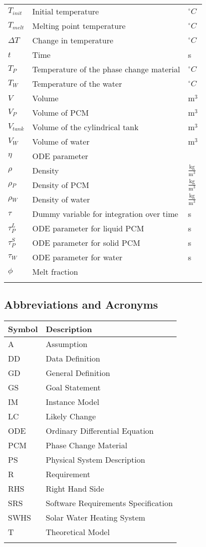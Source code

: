 \documentclass[12pt]{article}
\begin{document}
\begin{longtable*}{l l l}
$T_{init}$ & Initial temperature & ${}^{\circ}C$
\\
$T_{melt}$ & Melting point temperature & ${}^{\circ}C$
\\
$\Delta{}T$ & Change in temperature & ${}^{\circ}C$
\\
$t$ & Time & s
\\
$T_{P}$ & Temperature of the phase change material & ${}^{\circ}C$
\\
$T_{W}$ & Temperature of the water & ${}^{\circ}C$
\\
$V$ & Volume & $\text{m}^{3}$
\\
$V_{P}$ & Volume of PCM & $\text{m}^{3}$
\\
$V_{tank}$ & Volume of the cylindrical tank & $\text{m}^{3}$
\\
$V_{W}$ & Volume of water & $\text{m}^{3}$
\\
$\eta{}$ & ODE parameter & 
\\
$\rho{}$ & Density & $\frac{\text{kg}}{\text{m}^{3}}$
\\
$\rho{}_{P}$ & Density of PCM & $\frac{\text{kg}}{\text{m}^{3}}$
\\
$\rho{}_{W}$ & Density of water & $\frac{\text{kg}}{\text{m}^{3}}$
\\
$\tau{}$ & Dummy variable for integration over time & s
\\
$\tau{}_{P}^{L}$ & ODE parameter for liquid PCM & s
\\
$\tau{}_{P}^{S}$ & ODE parameter for solid PCM & s
\\
$\tau{}_{W}$ & ODE parameter for water & s
\\
$\phi{}$ & Melt fraction & 
\\
\bottomrule
\label{Table:TablofSymb}
\end{longtable*}
\subsection{Abbreviations and Acronyms}
\label{Sec:AbbrandAcro}
\begin{longtable*}{l l}
\toprule
Symbol & Description
\\
\midrule
A & Assumption
\\
DD & Data Definition
\\
GD & General Definition
\\
GS & Goal Statement
\\
IM & Instance Model
\\
LC & Likely Change
\\
ODE & Ordinary Differential Equation
\\
PCM & Phase Change Material
\\
PS & Physical System Description
\\
R & Requirement
\\
RHS & Right Hand Side
\\
SRS & Software Requirements Specification
\\
SWHS & Solar Water Heating System
\\
T & Theoretical Model
\\
\bottomrule
\label{Table:AbbrandAcro}
\end{longtable*}
\end{document}
